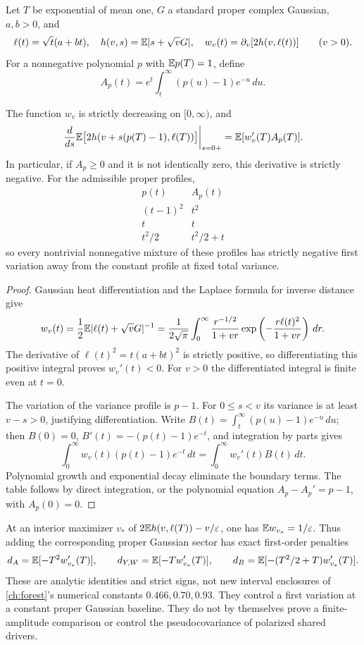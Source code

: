 Let \(T\) be exponential of mean one, \(G\) a standard proper complex
Gaussian, \(a,b>0\), and
\[
\ell(t)=\sqrt t(a+bt),\quad
h(v,s)=\mathbb E|s+\sqrt vG|,\quad
w_v(t)=\partial_v[2h(v,\ell(t))]\qquad(v>0).
\]
For a nonnegative polynomial \(p\) with \(\mathbb E p(T)=1\), define
\[
A_p(t)=e^t\int_t^\infty(p(u)-1)e^{-u}\,du.
\]

\begin{theorem}
\label{avg:profile}
The function \(w_v\) is strictly decreasing on \([0,\infty)\), and
\[
\left.\frac{d}{ds}\mathbb E\bigl[2h(v+s(p(T)-1),\ell(T))\bigr]
\right|_{s=0+}
=\mathbb E[w_v'(T)A_p(T)].
\]
In particular, if \(A_p\ge0\) and it is not identically zero, this
derivative is strictly negative. For the admissible proper profiles,
\[
\begin{array}{c|c}
p(t)&A_p(t)\\ \hline
(t-1)^2&t^2\\
t&t\\
t^2/2&t^2/2+t
\end{array}
\]
so every nontrivial nonnegative mixture of these profiles has strictly
negative first variation away from the constant profile at fixed
total variance.
\end{theorem}
\begin{proof}
Gaussian heat differentiation and the Laplace formula for inverse
distance give
\[
w_v(t)=\frac12\mathbb E|\ell(t)+\sqrt vG|^{-1}
=\frac1{2\sqrt\pi}\int_0^\infty
\frac{r^{-1/2}}{1+vr}
\exp\left(-\frac{r\ell(t)^2}{1+vr}\right)\,dr.
\]
The derivative of \(\ell(t)^2=t(a+bt)^2\) is strictly positive, so
differentiating this positive integral proves \(w_v'(t)<0\).
For \(v>0\) the differentiated integral is finite even at \(t=0\).

The variation of the variance profile is \(p-1\). For \(0\le s<v\)
its variance is at least \(v-s>0\), justifying differentiation.
Write \(B(t)=\int_t^\infty(p(u)-1)e^{-u}\,du\); then
\(B(0)=0\), \(B'(t)=-(p(t)-1)e^{-t}\), and integration by parts gives
\[
\int_0^\infty w_v(t)(p(t)-1)e^{-t}\,dt
=\int_0^\infty w_v'(t)B(t)\,dt.
\]
Polynomial growth and exponential decay eliminate the boundary terms.
The table follows by direct integration, or the polynomial equation
\(A_p-A_p'=p-1\), with \(A_p(0)=0\).
\end{proof}

At an interior maximizer \(v_*\) of
\(2\mathbb E h(v,\ell(T))-v/\varepsilon\), one has \(\mathbb E w_{v_*}=1/\varepsilon\).
Thus adding the corresponding proper Gaussian sector has exact
first-order penalties
\[
d_A=\mathbb E[-T^2w_{v_*}'(T)],\qquad
d_{Y,W}=\mathbb E[-Tw_{v_*}'(T)],\qquad
d_B=\mathbb E[-(T^2/2+T)w_{v_*}'(T)].
\]
These are analytic identities and strict signs, not new interval
enclosures of \autoref{ch:forest}'s numerical constants \(0.466,0.70,0.93\).
They control a first variation at a constant proper Gaussian
baseline. They do not by themselves prove a finite-amplitude
comparison or control the pseudocovariance of polarized shared
drivers.


